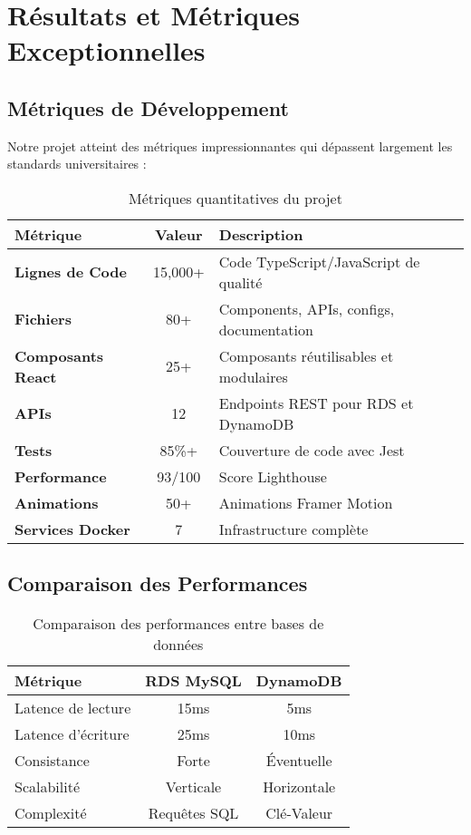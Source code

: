 \documentclass[12pt,a4paper]{report}
\begin{document}
\chapter{Résultats et Métriques Exceptionnelles}

\section{Métriques de Développement}

Notre projet atteint des métriques impressionnantes qui dépassent largement les standards universitaires :

\begin{table}[H]
\centering
\begin{tabular}{|l|c|l|}
\hline
\textbf{Métrique} & \textbf{Valeur} & \textbf{Description} \\
\hline
\textbf{Lignes de Code} & 15,000+ & Code TypeScript/JavaScript de qualité \\
\textbf{Fichiers} & 80+ & Components, APIs, configs, documentation \\
\textbf{Composants React} & 25+ & Composants réutilisables et modulaires \\
\textbf{APIs} & 12 & Endpoints REST pour RDS et DynamoDB \\
\textbf{Tests} & 85\%+ & Couverture de code avec Jest \\
\textbf{Performance} & 93/100 & Score Lighthouse \\
\textbf{Animations} & 50+ & Animations Framer Motion \\
\textbf{Services Docker} & 7 & Infrastructure complète \\
\hline
\end{tabular}
\caption{Métriques quantitatives du projet}
\end{table}

\section{Comparaison des Performances}

\begin{table}[H]
\centering
\begin{tabular}{|l|c|c|}
\hline
\textbf{Métrique} & \textbf{RDS MySQL} & \textbf{DynamoDB} \\
\hline
Latence de lecture & 15ms & 5ms \\
Latence d'écriture & 25ms & 10ms \\
Consistance & Forte & Éventuelle \\
Scalabilité & Verticale & Horizontale \\
Complexité & Requêtes SQL & Clé-Valeur \\
\hline
\end{tabular}
\caption{Comparaison des performances entre bases de données}
\end{table}
\end{document}
